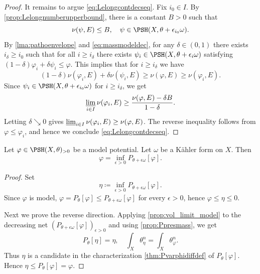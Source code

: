 \begin{proof}
    It remains to argue \eqref{eq:Lelongcontdecseq}.
    Fix $i_0\in I$. By \cref{prop:Lelongnumberupperbound}, there is a constant $B>0$ such that
    \[
    \nu(\psi,E)\leq B,\quad \psi\in \PSH(X,\theta+\epsilon_{i_0}\omega).
    \]
    By \cref{lma:pathoenvelope} and \eqref{eq:massmodeldec}, for any $\delta \in (0,1)$ there exists $i_{\delta}\geq i_0$ such that for all $i\geq i_{\delta}$ there exists $\psi_i \in \PSH(X,\theta+\epsilon_i\omega)$ satisfying $(1-\delta) \varphi_i + \delta \psi_i \leq \varphi$. This implies that for $i\geq i_{\delta}$ we have
    \[
    (1-\delta)\nu(\varphi_i,E) + \delta\nu(\psi_i,E) \geq \nu(\varphi,E) \geq \nu(\varphi_i,E).
    \]
    Since $\psi_i\in \PSH(X,\theta+\epsilon_{i_0}\omega)$ for $i\geq i_{\delta}$, we get
    \[
        \varliminf_{i\in I}\nu(\varphi_i,E)\geq \frac{\nu(\varphi,E)-\delta B}{1-\delta}.
    \]
    Letting $\delta\searrow 0$ gives $\varliminf_{i\in I}\nu(\varphi_i,E)\geq \nu(\varphi,E)$. The reverse inequality follows from $\varphi\leq \varphi_i$, and hence we conclude \eqref{eq:Lelongcontdecseq}.
\end{proof}








\begin{corollary}\label{cor:varphiperturbtheta}
    Let $\varphi\in \PSH(X,\theta)_{>0}$ be a model potential. Let $\omega$ be a Kähler form on $X$.
    Then
    \[
    \varphi=\inf_{\epsilon>0} P_{\theta+\epsilon\omega}[\varphi].
    \]
\end{corollary}
\begin{proof}
    Set
    \[
        \eta\coloneqq\inf_{\epsilon>0}P_{\theta+\epsilon\omega}[\varphi].
    \]
    Since $\varphi$ is model, $\varphi=P_{\theta}[\varphi]\leq P_{\theta+\epsilon\omega}[\varphi]$ for every $\epsilon>0$, hence $\varphi\leq\eta\leq 0$.

    Next we prove the reverse direction.
    Applying \cref{prop:vol_limit_model} to the decreasing net $(P_{\theta+\epsilon\omega}[\varphi])_{\epsilon>0}$ and using \cref{prop:Ppresmass}, we get
    \[
        P_\theta[\eta]=\eta,\quad \int_X\theta_\eta^n=\int_X\theta_\varphi^n.
    \]
    Thus $\eta$ is a candidate in the characterization \cref{thm:Pvarphidiffdef} of $P_\theta[\varphi]$. Hence $\eta\leq P_\theta[\varphi]=\varphi$.
\end{proof}

